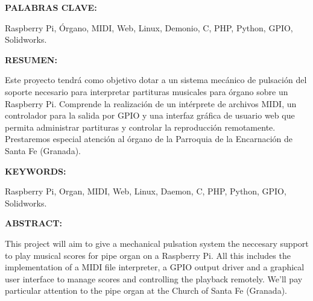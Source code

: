 \vspace{0.75cm}






\begin{doublespace}
\noindent \textbf{PALABRAS CLAVE:}
\end{doublespace}



\begin{singlespace}
\noindent Raspberry Pi, Órgano, MIDI, Web, Linux, Demonio, C, PHP, Python, GPIO, Solidworks.

\end{singlespace}

\begin{doublespace}
\noindent \textbf{RESUMEN:}
\end{doublespace}

\begin{singlespace}

\noindent Este proyecto tendrá como objetivo dotar a un sistema mecánico de pulsación del soporte necesario para interpretar partituras musicales para órgano sobre un Raspberry Pi. Comprende la realización de un intérprete de archivos MIDI, un controlador para la salida por GPIO y una interfaz gráfica de usuario web que permita administrar partituras y controlar la reproducción remotamente. Prestaremos especial atención al órgano de la Parroquia de la Encarnación de Santa Fe (Granada).
\end{singlespace}

\vspace{1.25cm}

\begin{doublespace}
\noindent \textbf{KEYWORDS:}
\end{doublespace}

\begin{singlespace}
\noindent Raspberry Pi, Organ, MIDI, Web, Linux, Daemon, C, PHP, Python, GPIO, Solidworks.
\end{singlespace}

\begin{doublespace}
\noindent \textbf{ABSTRACT:}
\end{doublespace}

\begin{singlespace}
\noindent This project will aim to give a mechanical pulsation system the neccesary support to play musical scores for pipe organ on a Raspberry Pi. All this includes the implementation of a MIDI file interpreter, a GPIO output driver and a graphical user interface to manage scores and controlling the playback remotely. We'll pay particular attention to the pipe organ at the Church of Santa Fe (Granada).
\end{singlespace}

